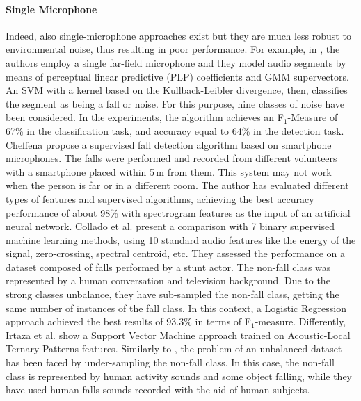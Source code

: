 \paragraph{Single Microphone}
 Indeed, also single-microphone approaches exist but they are much less robust to environmental noise, thus resulting in poor performance. For example, in \cite{zhuang2009acoustic}, the authors employ a single far-field microphone and they model audio segments by means of perceptual linear predictive (PLP) coefficients and GMM supervectors. An SVM with a kernel based on the Kullback-Leibler divergence, then, classifies the segment as being a fall or noise. For this purpose, nine classes of noise have been considered. In the experiments, the algorithm achieves an F$_1$-Measure of 67\% in the classification task, and accuracy equal to 64\% in the detection task. 
 Cheffena \cite{cheffena2016fall} propose a supervised fall detection algorithm based on smartphone microphones. The falls were performed and recorded from different volunteers with a smartphone placed within 5\,m from them. This system may not work when the person is far or in a different room. The author has evaluated different types of features and supervised algorithms, achieving the best accuracy performance of about 98\% with spectrogram features as the input of an artificial neural network.
 Collado et al. \cite{collado2017machine} present a comparison with 7 binary supervised machine learning methods, using 10 standard audio features like the energy of the signal, zero-crossing, spectral centroid, etc. They assessed the performance on a dataset composed of falls performed by a stunt actor. The non-fall class was represented by a human conversation and television background. Due to the strong classes unbalance, they have sub-sampled the non-fall class, getting the same number of instances of the fall class. In this context, a Logistic Regression approach achieved the best results of 93.3\% in terms of F$_1$-measure.
 Differently, Irtaza et al. \cite{irtaza2017framework} show a Support Vector Machine approach trained on Acoustic-Local Ternary Patterns features. Similarly to \cite{collado2017machine}, the problem of an unbalanced dataset has been faced by under-sampling the non-fall class. In this case, the non-fall class is represented by human activity sounds and some object falling, while they have used human falls sounds recorded with the aid of human subjects.

